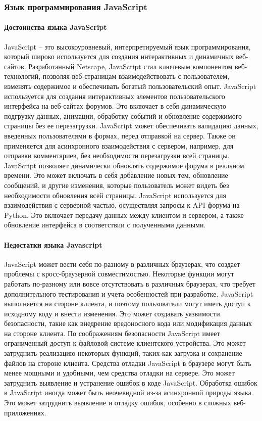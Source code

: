 \subsubsection{Язык программирования JavaScript}

\paragraph{Достоинства языка JavaScript}

JavaScript – это высокоуровневый, интерпретируемый язык программирования, который широко используется для создания интерактивных и динамичных веб-сайтов. Разработанный Netscape, JavaScript стал ключевым компонентом веб-технологий, позволяя веб-страницам взаимодействовать с пользователем, изменять содержимое и обеспечивать богатый пользовательский опыт. JavaScript используется для создания интерактивных элементов пользовательского интерфейса на веб-сайтах форумов. Это включает в себя динамическую подгрузку данных, анимации, обработку событий и обновление содержимого страницы без ее перезагрузки. JavaScript может обеспечивать валидацию данных, введенных пользователями в формах, перед отправкой на сервер. Также он применяется для асинхронного взаимодействия с сервером, например, для отправки комментариев, без необходимости перезагрузки всей страницы. JavaScript позволяет динамически обновлять содержимое форума в реальном времени. Это может включать в себя добавление новых тем, обновление сообщений, и другие изменения, которые пользователь может видеть без необходимости обновления всей страницы. JavaScript используется для взаимодействия с серверной частью, осуществляя запросы к API форума на Python. Это включает передачу данных между клиентом и сервером, а также обновление интерфейса в соответствии с полученными данными.

\paragraph{Недостатки языка Javascript}

JavaScript может вести себя по-разному в различных браузерах, что создает проблемы с кросс-браузерной совместимостью. Некоторые функции могут работать по-разному или вовсе отсутствовать в различных браузерах, что требует дополнительного тестирования и учета особенностей при разработке. JavaScript выполняется на стороне клиента, и поэтому пользователи могут иметь доступ к исходному коду и внести изменения. Это может создавать уязвимости безопасности, такие как внедрение вредоносного кода или модификация данных на стороне клиента. По соображениям безопасности JavaScript имеет ограниченный доступ к файловой системе клиентского устройства. Это может затруднить реализацию некоторых функций, таких как загрузка и сохранение файлов на стороне клиента. Средства отладки JavaScript в браузере могут быть менее мощными и удобными, чем средства отладки на сервере. Это может затруднить выявление и устранение ошибок в коде JavaScript. Обработка ошибок в JavaScript иногда может быть неочевидной из-за асинхронной природы языка. Это может затруднить выявление и отладку ошибок, особенно в сложных веб-приложениях.

